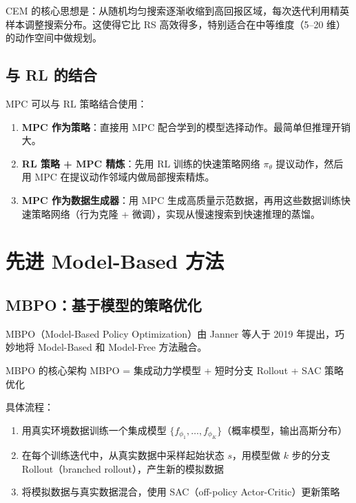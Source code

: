 CEM 的核心思想是：从随机均匀搜索逐渐收缩到高回报区域，每次迭代利用精英样本调整搜索分布。这使得它比 RS 高效得多，特别适合在中等维度（5--20 维）的动作空间中做规划。

\subsection{与 RL 的结合}

MPC 可以与 RL 策略结合使用：

\begin{enumerate}
    \item \textbf{MPC 作为策略}：直接用 MPC 配合学到的模型选择动作。最简单但推理开销大。
    \item \textbf{RL 策略 + MPC 精炼}：先用 RL 训练的快速策略网络 $\pi_\theta$ 提议动作，然后用 MPC 在提议动作邻域内做局部搜索精炼。
    \item \textbf{MPC 作为数据生成器}：用 MPC 生成高质量示范数据，再用这些数据训练快速策略网络（行为克隆 + 微调），实现从慢速搜索到快速推理的蒸馏。
\end{enumerate}

\section{先进 Model-Based 方法}

\subsection{MBPO：基于模型的策略优化}

MBPO（Model-Based Policy Optimization）由 Janner 等人于 2019 年提出，巧妙地将 Model-Based 和 Model-Free 方法融合。

\begin{mydefinition}{MBPO 的核心架构}
MBPO = 集成动力学模型 + 短时分支 Rollout + SAC 策略优化

具体流程：
\begin{enumerate}
    \item 用真实环境数据训练一个集成模型 $\{f_{\phi_1}, \dots, f_{\phi_K}\}$（概率模型，输出高斯分布）
    \item 在每个训练迭代中，从真实数据中采样起始状态 $s$，用模型做 $k$ 步的分支 Rollout（branched rollout），产生新的模拟数据
    \item 将模拟数据与真实数据混合，使用 SAC（off-policy Actor-Critic）更新策略
\end{enumerate}
\end{mydefinition}

